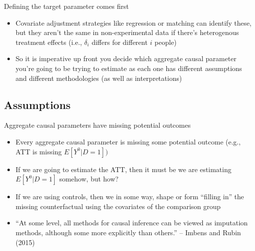 \documentclass{beamer}
\begin{document}
\begin{frame}{Defining the target parameter comes first}

\begin{itemize}
\item Covariate adjustment strategies like regression or matching can identify these, but they aren't the same in non-experimental data if there's heterogenous treatment effects (i.e., $\delta_i$ differs for different $i$ people)
\item So it is imperative up front you decide which aggregate causal parameter you're going to be trying to estimate as each one has different assumptions and different methodologies (as well as interpretations)

\end{itemize}

\end{frame}




\subsection{Assumptions}


\begin{frame}{Aggregate causal parameters have missing potential outcomes}


\begin{itemize}
\item Every aggregate causal parameter is missing some potential outcome (e.g., ATT is missing $E[Y^0|D=1])$
\item If we are going to estimate the ATT, then it must be we are estimating $E[Y^0|D=1]$ somehow, but how?
\item If we are using controls, then we in some way, shape or form ``filling in'' the missing counterfactual using the covariates of the comparison group
\item ``At some level, all methods for causal inference can be viewed as imputation methods, although some more explicitly than others.'' -- Imbens and Rubin (2015)

\end{itemize}


\end{frame}
\end{document}

